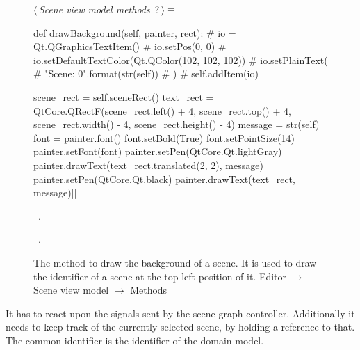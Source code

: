 \documentclass[%
    a4paper,    %
    justified,  %
    nobib,      %
    openany     %
]{tufte-book}
\begin{document}
\begin{figure}
\begin{flushleft} \small
\begin{minipage}{\linewidth}\label{scrap91}\raggedright\small
{} $\langle\,${\itshape Scene view model methods}\nobreak\ {\footnotesize {?}}$\,\rangle\equiv$
\vspace{-1ex}
\begin{pythoncode}
def drawBackground(self, painter, rect):
    # io = Qt.QGraphicsTextItem()
    # io.setPos(0, 0)
    # io.setDefaultTextColor(Qt.QColor(102, 102, 102))
    # io.setPlainText(
    #     "Scene: {0}".format(str(self))
    # )
    # self.addItem(io)

    scene_rect = self.sceneRect()
    text_rect = QtCore.QRectF(scene_rect.left()   + 4,
                              scene_rect.top()    + 4,
                              scene_rect.width()  - 4,
                              scene_rect.height() - 4)
    message = str(self)
    font = painter.font()
    font.setBold(True)
    font.setPointSize(14)
    painter.setFont(font)
    painter.setPen(QtCore.Qt.lightGray)
    painter.drawText(text_rect.translated(2, 2), message)
    painter.setPen(QtCore.Qt.black)
    painter.drawText(text_rect, message)|\NWsep|
\end{pythoncode}
\vspace{1.5ex}
\footnotesize
\begin{list}{}{\setlength{\itemsep}{-\parsep}\setlength{\itemindent}{-\leftmargin}}
\item \NWtxtMacroDefBy\ .
\item \NWtxtMacroRefIn\ .

\item{}
\end{list}
\end{minipage}\vspace{4ex}
\end{flushleft}
\caption{The method to draw the background of a scene. It is used to draw the
  identifier of a scene at the top left position of it.
  \newline{}\newline{}Editor $\rightarrow$ Scene view model $\rightarrow$
  Methods}
\label{editor:lst:scene-view-model:methods:draw-background}
\end{figure}

 It has to
react upon the signals sent by the scene graph controller. Additionally it needs
to keep track of the currently selected scene, by holding a reference to that.
The common identifier is the identifier of the domain model.
\end{document}
